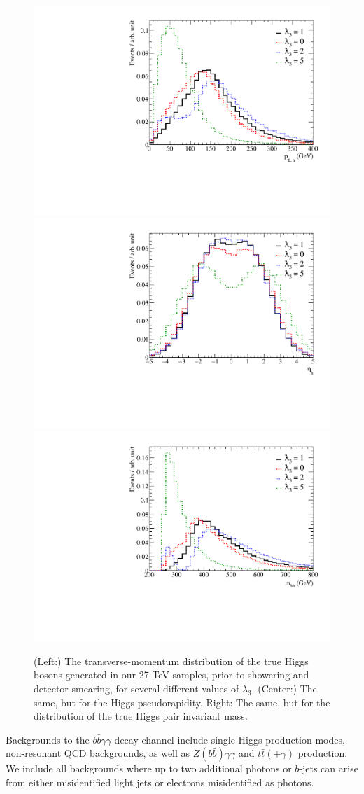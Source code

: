 \begin{figure}[h]
\centering
	\includegraphics[width=0.32\linewidth]{section3/plots/Higgs_PT.pdf}
	\hfill
	\includegraphics[width=0.32\linewidth]{section3/plots/Higgs_Eta.pdf}
	\hfill
	\includegraphics[width=0.32\linewidth]{section3/plots/Higgs_Mhh.pdf}
\caption{(Left:) The transverse-momentum distribution of the true Higgs bosons generated in our 27 TeV samples, prior to showering and detector smearing, for several different values of $\lambda_3$. (Center:) The same, but for the Higgs pseudorapidity. Right: The same, but for the distribution of the true Higgs pair invariant mass.}\label{fig:dihiggs_kinematics}
\end{figure}

Backgrounds to the $b\bar{b}\gamma\gamma$ decay channel include single Higgs production modes, non-resonant QCD backgrounds, as well as $Z(b\bar{b})\gamma\gamma$ and $t\bar{t}(+\gamma)$ production. We include all backgrounds where up to two additional photons or $b$-jets can arise from either misidentified light jets or electrons misidentified as photons.

